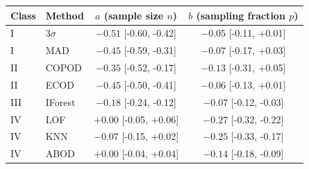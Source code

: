 \begin{tabular}{llcc}
\hline
\textbf{Class} & \textbf{Method} & $a$ (sample size $n$) & $b$ (sampling fraction $p$) \\
\hline
I & $3\sigma$ & $-0.51$ [-0.60, -0.42] & $-0.05$ [-0.11, +0.01] \\
I & MAD & $-0.45$ [-0.59, -0.31] & $-0.07$ [-0.17, +0.03] \\
II & COPOD & $-0.35$ [-0.52, -0.17] & $-0.13$ [-0.31, +0.05] \\
II & ECOD & $-0.45$ [-0.50, -0.41] & $-0.06$ [-0.13, +0.01] \\
III & IForest & $-0.18$ [-0.24, -0.12] & $-0.07$ [-0.12, -0.03] \\
IV & LOF & $+0.00$ [-0.05, +0.06] & $-0.27$ [-0.32, -0.22] \\
IV & KNN & $-0.07$ [-0.15, +0.02] & $-0.25$ [-0.33, -0.17] \\
IV & ABOD & $+0.00$ [-0.04, +0.04] & $-0.14$ [-0.18, -0.09] \\
\hline
\end{tabular}
